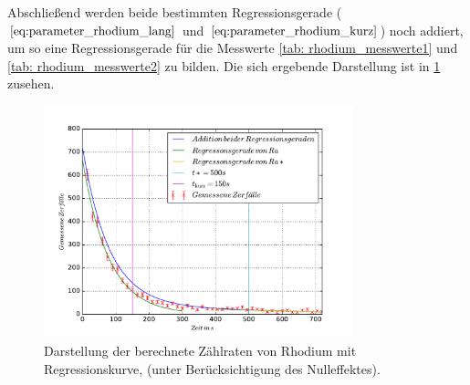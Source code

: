 Abschließend werden beide bestimmten Regressionsgerade ($\eqref{eq:parameter_rhodium_lang}$ und $\eqref{eq:parameter_rhodium_kurz}$) noch addiert, um so eine
Regressionsgerade für die Messwerte \ref{tab: rhodium_messwerte1} und \ref{tab: rhodium_messwerte2} zu bilden.
Die sich ergebende Darstellung ist in \ref{fig: plot_rhodium_addi} zusehen.

\begin{figure}
  \centering
  \includegraphics[width=0.8\textwidth]{pics/ra_addi.pdf}
  \caption{Darstellung der berechnete Zählraten von Rhodium mit Regressionskurve, (unter Berücksichtigung des Nulleffektes).}
  \label{fig: plot_rhodium_addi}
\end{figure}
